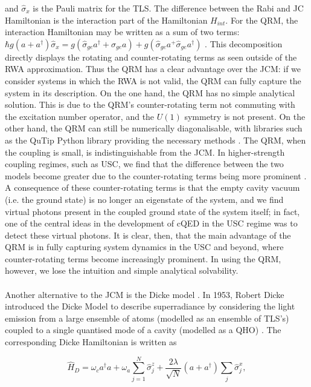 \documentclass[12pt,a4paper]{article}
\begin{document}
and $\hat{\sigma}_{x}$ is the Pauli matrix for the TLS. The difference between the Rabi and JC Hamiltonian is the interaction part of the Hamiltonian $H_{int}$. For the QRM, the interaction Hamiltonian may be written as a sum of two terms:
$\hbar g(a + a^\dagger)\hat{\sigma}_{x} = g(\hat{\sigma}_{ge}a^\dagger+\hat{\sigma}_{ge}a) + g(\hat{\sigma}_{ge}a^+\hat{\sigma}_{ge}a^\dagger)$ \cite{Hamiltonian2017-Rabi}. This decomposition directly displays the rotating and counter-rotating terms as seen outside of the RWA approximation. Thus the QRM has a clear advantage over the JCM: if we consider systems in which the RWA is not valid, the QRM can fully capture the system in its description. On the one hand, the QRM has no simple analytical solution. This is due to the QRM's counter-rotating term not commuting with the excitation number operator, and the $U(1)$ symmetry is not present. On the other hand, the QRM can still be numerically diagonalisable, with libraries such as the QuTip Python library providing the necessary methods \cite{General2024-JCM_relevance}. 
The QRM, when the coupling is small, is indistinguishable from the JCM. In higher-strength coupling regimes, such as USC, we find that the difference between the two models become greater due to the counter-rotating terms being more prominent \cite{General2024-JCM_relevance}. A consequence of these counter-rotating terms is that the empty cavity vacuum (i.e. the ground state) is no longer an eigenstate of the system, and we find virtual photons present in the coupled ground state of the system itself; in fact, one of the central ideas in the development of cQED in the USC regime was to detect these virtual photons. It is clear, then, that the main advantage of the QRM is in fully capturing system dynamics in the USC and beyond, where counter-rotating terms become increasingly prominent. In using the QRM, however, we lose the intuition and simple analytical solvability.\\
\\
Another alternative to the JCM is the Dicke model \cite{Context1954-Dicke}. In 1953, Robert Dicke introduced the Dicke Model to describe superradiance by considering the light emission from a large ensemble of atoms (modelled as an ensemble of TLS's) coupled to a single quantised mode of a cavity (modelled as a QHO) \cite{Hamiltonian2019-Dicke}. The corresponding Dicke Hamiltonian is written as 

\begin{equation}
    \hat{H}_D = \omega_ca^\dagger a  +\omega_a\sum^N_{j=1}\hat{\sigma}_j^z + \frac{2\lambda}{\sqrt{N}}(a + a^\dagger)\sum_j\hat{\sigma}_j^x,
\end{equation}
\end{document}
